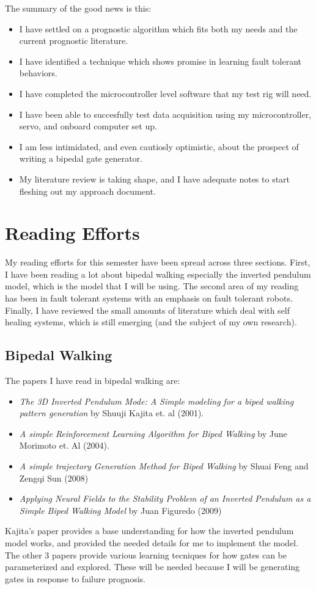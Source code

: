 \documentclass[12pt]{article}
\begin{document}
The summary of the good news is this:
\begin{itemize}
  \item I have settled on a prognostic algorithm which fits
    both my needs and the current prognostic literature.
  \item I have identified a technique which shows promise in learning
    fault tolerant behaviors.
  \item I have completed the microcontroller level software that my
    test rig will need.
  \item I have been able to succesfully test data acquisition using my
    microcontroller, servo, and onboard computer set up.
  \item I am less intimidated, and even cautiosly optimistic, about
    the prospect of writing a bipedal gate generator.
  \item My literature review is taking shape, and I have adequate
    notes to start fleshing out my approach document.
\end{itemize}

\section{Reading Efforts}
My reading efforts for this semester have been spread across three
sections.  First, I have been reading a lot about bipedal walking
especially the inverted pendulum model, which is the model that I will
be using.  The second area of my reading has been in fault tolerant
systems with an emphasis on fault tolerant robots.  Finally, I have
reviewed the small amounts of literature which deal with self healing
systems, which is still emerging (and the subject of my own research).

\subsection{Bipedal Walking}
The papers I have read in bipedal walking are:
\begin{itemize}
  \item {\em The 3D Inverted Pendulum Mode: A Simple modeling for a
    biped walking pattern generation} by Shuuji Kajita et. al (2001).
  \item {\em A simple Reinforcement Learning Algorithm for Biped
    Walking} by June Morimoto et. Al (2004).
  \item {\em A simple trajectory Generation Method for Biped Walking}
    by Shuai Feng  and Zengqi Sun (2008)
  \item {\em Applying Neural Fields to the Stability Problem of an
    Inverted Pendulum as a Simple Biped Walking Model} by Juan
    Figuredo (2009)
\end{itemize}
Kajita's paper provides a base understanding for how the inverted
pendulum model works, and provided the needed details for me to
implement the model.  The other 3 papers provide various learning
tecniques for how gates can be parameterized and explored.  These will
be needed because I will be generating gates in response to failure
prognosis.
\end{document}
